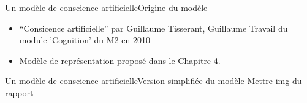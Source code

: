 \begin{frame}{Un modèle de conscience artificielle}{Origine du modèle}
\begin{itemize}
  \item ``Consicence
  artificielle'' par Guillaume Tisserant, Guillaume Travail du module
  'Cognition' du M2 en 2010
  \item Modèle de représentation proposé dans le Chapitre 4.
\end{itemize}
\end{frame}

\begin{frame}{Un modèle de conscience artificielle}{Version simplifiée du
modèle}
Mettre img du rapport

\end{frame}

